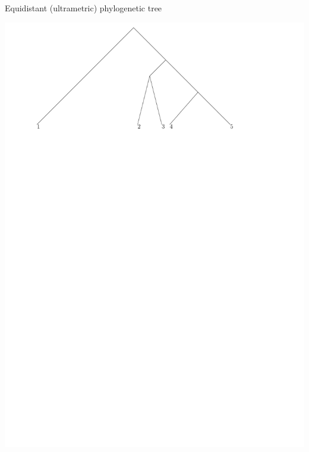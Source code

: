 \documentclass{beamer}
\begin{document}
\begin{frame}{Equidistant (ultrametric) phylogenetic tree}
\begin{definition}
\includegraphics[width=\framewidth]{rooted_time}
\end{definition}
\end{frame}
\end{document}
